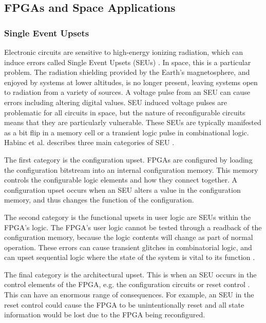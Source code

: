 \documentclass[12pt]{article}
\begin{document}
\subsection{FPGAs and Space Applications}
\label{sec:Background-FPGAsAndSpaceApplications}


\subsubsection{Single Event Upsets}
\label{sec:Background-FPGAsAndSpaceApplications-SEUs}


Electronic circuits are sensitive to high-energy ionizing radiation, which can induce errors called Single Event Upsets (SEUs) \cite{SeuTutorial}. In space, this is a particular problem. The radiation shielding provided by the Earth's magnetosphere, and enjoyed by systems at lower altitudes, is no longer present, leaving systems open to radiation from a  variety of sources. A voltage pulse from an SEU can cause errors including altering digital values. SEU induced voltage pulses are problematic for all circuits in space, but the nature of reconfigurable circuits means that they are particularly vulnerable. These SEUs are typically manifested as a bit flip in a memory cell or a transient logic pulse in combinational logic. Habinc et al. describes three main categories of SEU \cite{SuitabilityGaisler}.

The first category is the configuration upset. FPGAs are configured by loading the configuration bitstream into an internal configuration memory. This memory controls the configurable logic elements and how they connect together. A configuration upset occurs when an SEU alters a value in the configuration memory, and thus changes the function of the configuration. 

The second category is the functional upsets in user logic are SEUs within the FPGA's logic. The FPGA's user logic cannot be tested through a readback of the configuration memory, because the logic contents will change as part of normal operation. These errors can cause transient glitches in combinatorial logic, and can upset sequential logic where the state of the system is vital to its function \cite{FTripleMR}.

The final category is the architectural upset. This is when an SEU occurs in the control elements of the FPGA, e.g. the configuration circuits or reset control \cite{SuitabilityGaisler}. This can have an enormous range of consequences. For example, an SEU in the reset control could cause the FPGA to be unintentionally reset and all state information would be lost due to the FPGA being reconfigured.
\end{document}
